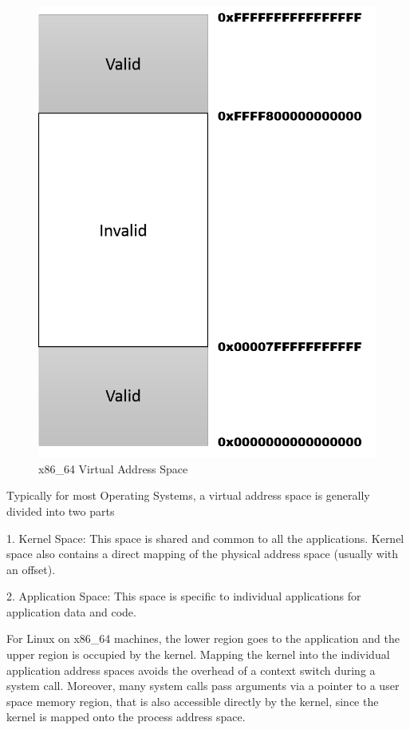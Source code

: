 \begin{figure}[H]
\centering
\includegraphics[scale=0.6]{figures/x86_64_VA_space.png}
\caption{x86\_64 Virtual Address Space}
\label{fig:x86_memspace}
\end{figure}

Typically for most Operating Systems, a virtual address space is generally divided into two parts

1. Kernel Space: This space is shared and common to all the applications. Kernel space also contains a direct mapping of the physical address space (usually with an offset).

2. Application Space: This space is specific to individual applications for application data and code.

For Linux on x86\_64 machines, the lower region goes to the application and the upper region is occupied by the kernel. Mapping the kernel into the individual application address spaces avoids the overhead of a context switch during a system call. Moreover, many system calls pass arguments via a pointer to a user space memory region, that is also accessible directly by the kernel, since the kernel is mapped onto the process address space. 


